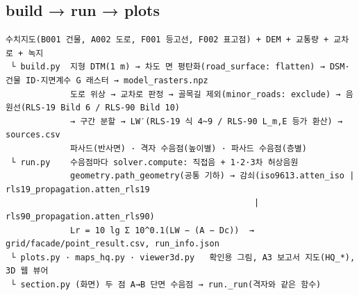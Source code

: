 \documentclass[10.5pt,a4paper]{article}
\begin{document}
\subsection{build → run → plots}
\begin{Verbatim}
수치지도(B001 건물, A002 도로, F001 등고선, F002 표고점) + DEM + 교통량 + 교차로 + 녹지
 └ build.py  지형 DTM(1 m) → 차도 면 평탄화(road_surface: flatten) → DSM·건물 ID·지면계수 G 래스터 → model_rasters.npz
             도로 위상 → 교차로 판정 → 골목길 제외(minor_roads: exclude) → 음원선(RLS-19 Bild 6 / RLS-90 Bild 10)
             → 구간 분할 → LW′(RLS-19 식 4~9 / RLS-90 L_m,E 등가 환산) → sources.csv
             파사드(반사면) · 격자 수음점(높이별) · 파사드 수음점(층별)
 └ run.py    수음점마다 solver.compute: 직접음 + 1·2·3차 허상음원
             geometry.path_geometry(공통 기하) → 감쇠(iso9613.atten_iso | rls19_propagation.atten_rls19
                                                  | rls90_propagation.atten_rls90)
             Lr = 10 lg Σ 10^0.1(LW − (A − Dc))  → grid/facade/point_result.csv, run_info.json
 └ plots.py · maps_hq.py · viewer3d.py   확인용 그림, A3 보고서 지도(HQ_*), 3D 웹 뷰어
 └ section.py (화면) 두 점 A→B 단면 수음점 → run._run(격자와 같은 함수)
\end{Verbatim}
\end{document}
